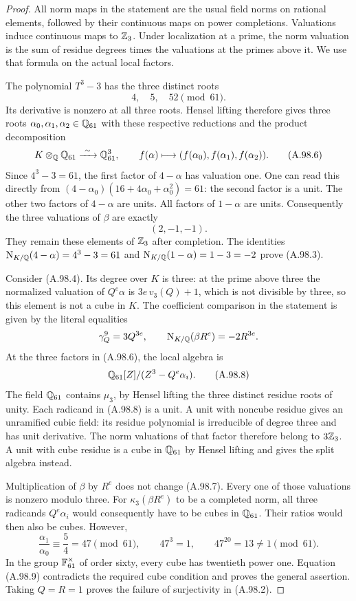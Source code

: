 \begin{proof}
All norm maps in the statement are the usual field norms on
rational elements, followed by their continuous maps on power
completions.  Valuations induce continuous maps to $\mathbb Z_3$.
Under localization at a prime, the norm valuation is the sum of
residue degrees times the valuations at the primes above it.
We use that formula on the actual local factors.

The polynomial $T^3-3$ has the three distinct roots
\[
                          4,\quad5,\quad52\pmod {61}.
 \tag{A.98.5}
\]
Its derivative is nonzero at all three roots.  Hensel lifting
therefore gives three roots $\alpha_0,\alpha_1,\alpha_2\in\mathbb Q_{61}$
with these respective reductions and the product decomposition
\[
 K\otimes_\Q\Q_{61}\xrightarrow{\ \sim\ }\Q_{61}^3,
       \qquad f(\alpha)\longmapsto
                   (f(\alpha_0),f(\alpha_1),f(\alpha_2)).
 \tag{A.98.6}
\]
Since $4^3-3=61$, the first factor of $4-\alpha$ has valuation
one.  One can read this directly from
$(4-\alpha_0)(16+4\alpha_0+\alpha_0^2)=61$:
the second factor is a unit.  The other two factors of
$4-\alpha$ are units.  All factors of $1-\alpha$ are units.
Consequently the three valuations of $\beta$ are exactly
\[
                              (2,-1,-1).
 \tag{A.98.7}
\]
They remain these elements of $\mathbb Z_3$ after completion.
The identities
$\mathrm N_{K/\mathbb Q}(4-\alpha)=4^3-3=61$ and
$\mathrm N_{K/\mathbb Q}(1-\alpha)=1-3=-2$ prove (A.98.3).

Consider (A.98.4).  Its degree over $K$ is three:
at the prime above three the normalized valuation of
$Q^e\alpha$ is $3e\,v_3(Q)+1$, which is not divisible by
three, so this element is not a cube in $K$.
The coefficient comparison in the statement is given by the
literal equalities
\[
          \gamma_Q^9=3Q^{3e},\qquad
          \mathrm N_{K/\mathbb Q}(\beta R^e)=-2R^{3e}.
\]
At the three factors in (A.98.6), the local algebra is
\[
                 \mathbb Q_{61}[Z]/(Z^3-Q^e\alpha_i).
 \tag{A.98.8}
\]
The field $\mathbb Q_{61}$ contains $\mu_3$, by Hensel lifting
the three distinct residue roots of unity.
Each radicand in (A.98.8) is a unit.  A unit with noncube
residue gives an unramified cubic field: its residue polynomial
is irreducible of degree three and has unit derivative.
The norm valuations of that factor therefore belong to
$3\mathbb Z_3$.  A unit with cube residue is a cube in $\mathbb Q_{61}$
by Hensel lifting and gives the split algebra instead.

Multiplication of $\beta$ by $R^e$ does not change (A.98.7).
Every one of those valuations is nonzero modulo three.
For $\kappa_3(\beta R^e)$ to be a completed norm, all three
radicands $Q^e\alpha_i$ would consequently have to be cubes
in $\mathbb Q_{61}$.
Their ratios would then also be cubes.  However,
\[
 \frac{\alpha_1}{\alpha_0}\equiv\frac54=47\pmod {61},
                  \qquad 47^3=1,
                  \qquad47^{20}=13\ne1\pmod {61}.
 \tag{A.98.9}
\]
In the group $\mathbb F_{61}^{\times}$ of order sixty, every cube
has twentieth power one.  Equation (A.98.9) contradicts
the required cube condition and proves the general assertion.
Taking $Q=R=1$ proves the failure of surjectivity in (A.98.2).


\end{proof}
